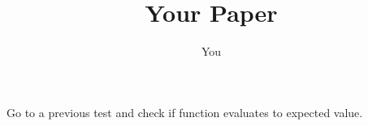 \documentclass{article}
\title{Your Paper}
\author{You}
\begin{document}
Go to a previous test and check if function evaluates to expected value.
\end{document}

